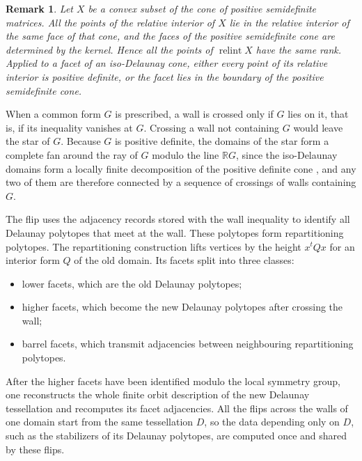 \documentclass{amsart}
\newtheorem{remark}{Remark}
\newcommand{\relint}{\operatorname{relint}}
\newcommand{\RR}{\mathbb{R}}
\begin{document}
\begin{remark}\label{rem:facet_pd}
Let \(X\) be a convex subset of the cone of positive semidefinite matrices.
All the points of the relative interior of \(X\) lie in the relative interior
of the same face of that cone, and the faces of the positive semidefinite
cone are determined by the kernel.  Hence all the points of \(\relint X\)
have the same rank.  Applied to a facet of an iso-Delaunay cone, either every
point of its relative interior is positive definite, or the facet lies in the
boundary of the positive semidefinite cone.
\end{remark}

When a common form \(G\) is prescribed, a wall is crossed only if \(G\) lies
on it, that is, if its inequality vanishes at \(G\).  Crossing a wall not
containing \(G\) would leave the star of \(G\).  Because \(G\) is positive
definite, the domains of the star form a complete fan around the ray of \(G\)
modulo the line \(\RR G\), since the iso-Delaunay domains form a locally
finite decomposition of the positive definite cone
\cite{DutourSikiriSchurmannVallentin2008}, and any two of them are therefore
connected by a sequence of crossings of walls containing \(G\).

The flip uses the adjacency records stored with the wall inequality to identify
all Delaunay polytopes that meet at the wall.  These polytopes form
repartitioning polytopes.  The repartitioning construction lifts vertices by
the height \(x^tQx\) for an interior form \(Q\) of the old domain.  Its facets
split into three classes:
\begin{itemize}[leftmargin=2em]
  \item lower facets, which are the old Delaunay polytopes;
  \item higher facets, which become the new Delaunay polytopes after crossing
        the wall;
  \item barrel facets, which transmit adjacencies between neighbouring
        repartitioning polytopes.
\end{itemize}
After the higher facets have been identified modulo the local symmetry group,
one reconstructs the whole finite orbit description of the new Delaunay
tessellation and recomputes its facet adjacencies.  All the flips across the
walls of one domain start from the same tessellation \(D\), so the data
depending only on \(D\), such as the stabilizers of its Delaunay polytopes,
are computed once and shared by these flips.
\end{document}
